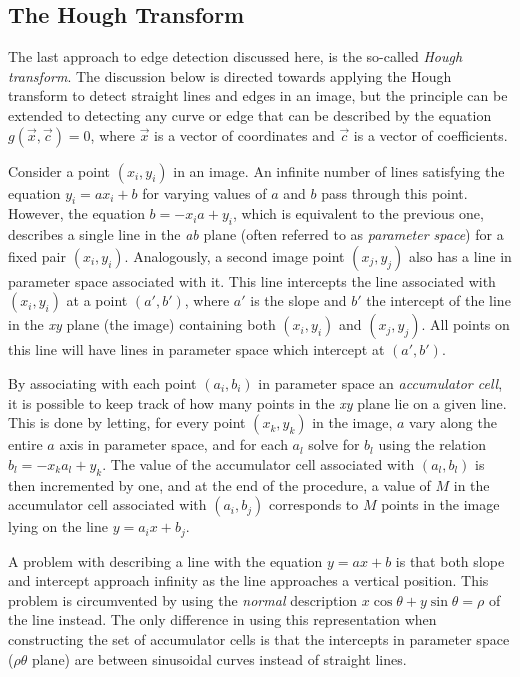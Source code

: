 \subsection{The Hough Transform}
\label{image:edge:hough}

The last approach to edge detection discussed here, is the so-called
{\em Hough transform\/}.  The discussion below is directed towards
applying the Hough transform to detect straight lines and edges in an
image, but the principle can be extended to detecting any curve or
edge that can be described by the equation $g(\vec{x},\vec{c})=0$,
where $\vec{x}$ is a vector of coordinates and $\vec{c}$ is a vector
of coefficients.

Consider a point $(x_{i},y_{i})$ in an image.  An infinite number of
lines satisfying the equation $y_{i}=ax_{i}+b$ for varying values of
$a$ and $b$ pass through this point.  However, the equation
$b=-x_{i}a+y_{i}$, which is equivalent to the previous one, describes
a single line in the {\it ab\/} plane (often referred to as {\em
  parameter space\/}) for a fixed pair $(x_{i},y_{i})$.  Analogously,
a second image point $(x_{j},y_{j})$ also has a line in parameter
space associated with it.  This line intercepts the line associated
with $(x_{i},y_{i})$ at a point $(a',b')$, where $a'$ is the slope and
$b'$ the intercept of the line in the {\it xy\/} plane (the image)
containing both $(x_{i},y_{i})$ and $(x_{j},y_{j})$.  All points on
this line will have lines in parameter space which intercept at
$(a',b')$.

By associating with each point $(a_{i},b_{i})$ in parameter space an
{\em accumulator cell\/}, it is possible to keep track of how many
points in the {\it xy\/} plane lie on a given line.  This is done by
letting, for every point $(x_{k},y_{k})$ in the image, $a$ vary along
the entire $a$ axis in parameter space, and for each $a_{l}$ solve for
$b_{l}$ using the relation $b_{l}=-x_{k}a_{l}+y_{k}$.  The value of
the accumulator cell associated with $(a_{l},b_{l})$ is then
incremented by one, and at the end of the procedure, a value of $M$ in
the accumulator cell associated with $(a_{i},b_{j})$ corresponds to
$M$ points in the image lying on the line $y=a_{i}x+b_{j}$.

A problem with describing a line with the equation $y=ax+b$ is that
both slope and intercept approach infinity as the line approaches a
vertical position.  This problem is circumvented by using the {\em
  normal\/} description $x\cos\theta+y\sin\theta=\rho$ of the line
instead.  The only difference in using this representation when
constructing the set of accumulator cells is that the intercepts in
parameter space ($\rho\theta$ plane) are between sinusoidal curves
instead of straight lines.

